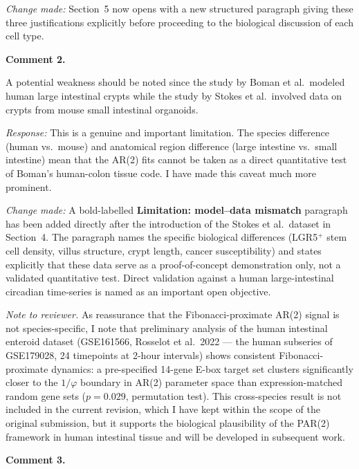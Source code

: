 \documentclass[12pt,a4paper]{article}
\newcommand{\point}[1]{\medskip\noindent\textbf{Comment #1.}\enspace}
\newcommand{\response}{\noindent\textit{Response:}\enspace}
\newcommand{\change}{\noindent\textit{Change made:}\enspace}
\begin{document}
\change
Section~5 now opens with a new structured paragraph giving these
three justifications explicitly before proceeding to the biological
discussion of each cell type.

\point{2}

\begin{reviewbox}
A potential weakness should be noted since the study by Boman et al.\
modeled human large intestinal crypts while the study by Stokes et al.\
involved data on crypts from mouse small intestinal organoids.
\end{reviewbox}

\response
This is a genuine and important limitation.
The species difference (human vs.\ mouse) and anatomical region
difference (large intestine vs.\ small intestine) mean that the AR(2)
fits cannot be taken as a direct quantitative test of Boman's
human-colon tissue code.
I have made this caveat much more prominent.

\change
A bold-labelled \textbf{Limitation: model--data mismatch} paragraph has
been added directly after the introduction of the Stokes et al.\ dataset
in Section~4.
The paragraph names the specific biological differences (LGR5$^{+}$
stem cell density, villus structure, crypt length, cancer
susceptibility) and states explicitly that these data serve as a
proof-of-concept demonstration only, not a validated quantitative test.
Direct validation against a human large-intestinal circadian time-series
is named as an important open objective.

\medskip
\noindent\textit{Note to reviewer.}
As reassurance that the Fibonacci-proximate AR(2) signal is not
species-specific, I note that preliminary analysis of the human
intestinal enteroid dataset (GSE161566, Rosselot et al.\ 2022 ---
the human subseries of GSE179028, 24 timepoints at 2-hour intervals)
shows consistent Fibonacci-proximate dynamics: a pre-specified
14-gene E-box target set clusters significantly closer to the $1/\varphi$
boundary in AR(2) parameter space than expression-matched random
gene sets ($p = 0.029$, permutation test).
This cross-species result is not included in the current revision,
which I have kept within the scope of the original submission,
but it supports the biological plausibility of the PAR(2) framework
in human intestinal tissue and will be developed in subsequent work.

\point{3}
\end{document}
